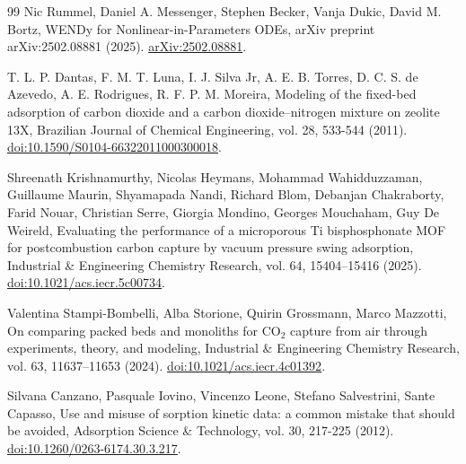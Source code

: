 \begin{thebibliography}{99}
 Nic Rummel, Daniel A. Messenger, Stephen Becker, Vanja Dukic, David M. Bortz, WENDy for Nonlinear-in-Parameters ODEs, arXiv preprint arXiv:2502.08881 (2025). \href{https://arxiv.org/abs/2502.08881}{arXiv:2502.08881}.

 T. L. P. Dantas, F. M. T. Luna, I. J. Silva Jr, A. E. B. Torres, D. C. S. de Azevedo, A. E. Rodrigues, R. F. P. M. Moreira, Modeling of the fixed-bed adsorption of carbon dioxide and a carbon dioxide--nitrogen mixture on zeolite 13X, Brazilian Journal of Chemical Engineering, vol. 28, 533-544 (2011). \href{https://doi.org/10.1590/S0104-66322011000300018}{doi:10.1590/S0104-66322011000300018}.

 Shreenath Krishnamurthy, Nicolas Heymans, Mohammad Wahidduzzaman, Guillaume Maurin, Shyamapada Nandi, Richard Blom, Debanjan Chakraborty, Farid Nouar, Christian Serre, Giorgia Mondino, Georges Mouchaham, Guy De Weireld, Evaluating the performance of a microporous Ti bisphosphonate MOF for postcombustion carbon capture by vacuum pressure swing adsorption, Industrial \& Engineering Chemistry Research, vol. 64, 15404--15416 (2025). \href{https://doi.org/10.1021/acs.iecr.5c00734}{doi:10.1021/acs.iecr.5c00734}.

 Valentina Stampi-Bombelli, Alba Storione, Quirin Grossmann, Marco Mazzotti, On comparing packed beds and monoliths for CO$_2$ capture from air through experiments, theory, and modeling, Industrial \& Engineering Chemistry Research, vol. 63, 11637--11653 (2024). \href{https://doi.org/10.1021/acs.iecr.4c01392}{doi:10.1021/acs.iecr.4c01392}.

 Silvana Canzano, Pasquale Iovino, Vincenzo Leone, Stefano Salvestrini, Sante Capasso, Use and misuse of sorption kinetic data: a common mistake that should be avoided, Adsorption Science \& Technology, vol. 30, 217-225 (2012). \href{https://doi.org/10.1260/0263-6174.30.3.217}{doi:10.1260/0263-6174.30.3.217}.


\end{thebibliography}
